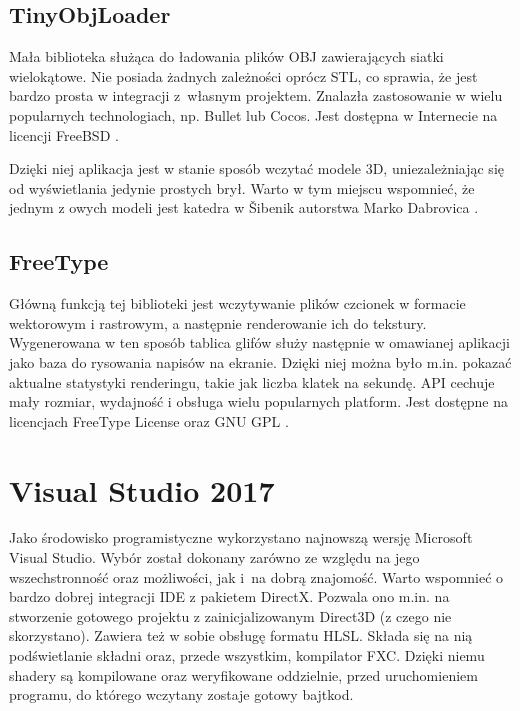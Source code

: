 		\subsection{TinyObjLoader}
		\label{t:technologie:helpers:obj}
		
		Mała biblioteka służąca do ładowania plików OBJ zawierających siatki wielokątowe. Nie posiada żadnych zależności oprócz STL, co sprawia, że jest bardzo prosta w integracji z~własnym projektem. Znalazła zastosowanie w wielu popularnych technologiach, np. Bullet lub Cocos. Jest dostępna w Internecie na licencji FreeBSD \cite{tech04}.
		
		Dzięki niej aplikacja jest w stanie sposób wczytać modele 3D, uniezależniając się od wyświetlania jedynie prostych brył. Warto w tym miejscu wspomnieć, że jednym z owych modeli jest katedra w \v{S}ibenik autorstwa Marko Dabrovica \cite{tech05}.
		
		\subsection{FreeType}
		\label{t:technologie:helpers:freetype}
		
		Główną funkcją tej biblioteki jest wczytywanie plików czcionek w formacie wektorowym i rastrowym, a następnie renderowanie ich do tekstury. Wygenerowana w ten sposób tablica glifów służy następnie w omawianej aplikacji jako baza do rysowania napisów na ekranie. Dzięki niej można było m.in. pokazać aktualne statystyki renderingu, takie jak liczba klatek na sekundę. API cechuje mały rozmiar, wydajność i obsługa wielu popularnych platform. Jest dostępne na licencjach FreeType License oraz GNU GPL \cite{tech06}.
	
	\section{Visual Studio 2017}
	\label{t:technologie:vs}
	
	Jako środowisko programistyczne wykorzystano najnowszą wersję Microsoft Visual Studio. Wybór został dokonany zarówno ze względu na jego wszechstronność oraz możliwości, jak i~na dobrą znajomość. Warto wspomnieć o bardzo dobrej integracji IDE z pakietem DirectX. Pozwala ono m.in. na stworzenie gotowego projektu z zainicjalizowanym Direct3D (z czego nie skorzystano). Zawiera też w sobie obsługę formatu HLSL. Składa się na nią podświetlanie składni oraz, przede wszystkim, kompilator FXC. Dzięki niemu shadery są kompilowane oraz weryfikowane oddzielnie, przed uruchomieniem programu, do którego wczytany zostaje gotowy bajtkod.
	
